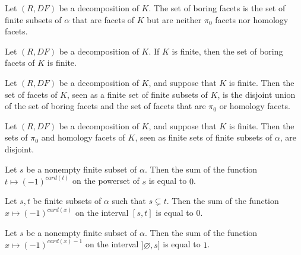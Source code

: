 \begin{subdefi}[BoringFacets]
Let $(R,DF)$ be a decomposition of $K$. The set of boring facets is the set of finite subsets of $\alpha$ that are facets of $K$ but
are neither $\pi_0$ facets nor homology facets.

\end{subdefi}

\begin{sublemma}
Let $(R,DF)$ be a decomposition of $K$. If $K$ is finite, then the set of boring facets of $K$ is finite.

\end{sublemma}

\begin{sublemma}
Let $(R,DF)$ be a decomposition of $K$, and suppose that $K$ is finite. Then the set of facets of $K$, seen as a finite set of
finite subsets of $K$, is the disjoint union of the set of boring facets and the set of facets that are $\pi_0$ or homology facets.

\end{sublemma}

\begin{sublemma}
Let $(R,DF)$ be a decomposition of $K$, and suppose that $K$ is finite. Then the sets of $\pi_0$ and homology facets of $K$, seen
as finite sets of finite subsets of $\alpha$, are disjoint.

\end{sublemma}


\begin{sublemma}[AlternatingSumPowerset]
Let $s$ be a nonempty finite subset of $\alpha$. Then 
the sum of the function $t\mapsto (-1)^{card(t)}$ on the powerset of $s$ is equal to $0$.

\end{sublemma}

\begin{sublemma}
Let $s,t$ be finite subsets of $\alpha$ such that $s\subsetneq t$. Then 
the sum of the function $x\mapsto (-1)^{card(x)}$ on the interval $[s,t]$ is equal to $0$.

\end{sublemma}

\begin{sublemma}
Let $s$ be a nonempty finite subset of $\alpha$. Then 
the sum of the function $x\mapsto (-1)^{card(x)-1}$ on the interval $]\varnothing,s]$ is equal to $1$.

\end{sublemma}

